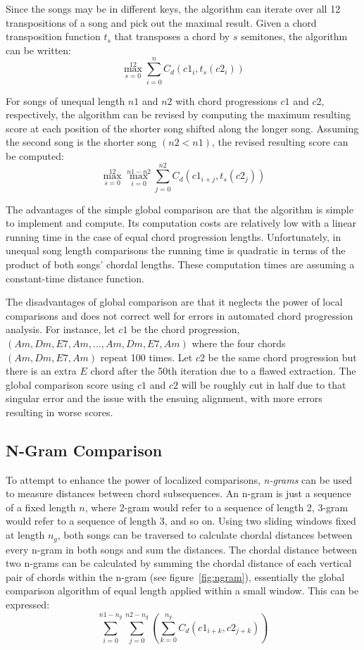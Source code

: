 Since the songs may be in different keys, the algorithm can iterate over all 12 transpositions of a song and pick out the maximal result. Given a chord transposition function $t_s$ that transposes a chord by $s$ semitones, the algorithm can be written: \[ \max_{s=0}^{12} \sum_{i=0}^n C_d({c1}_i, t_s({c2}_i)) \]

For songs of unequal length ${n1}$ and ${n2}$ with chord progressions ${c1}$ and ${c2}$, respectively, the algorithm can be revised by computing the maximum resulting score at each position of the shorter song shifted along the longer song. Assuming the second song is the shorter song $({n2} < {n1})$, the revised resulting score can be computed: \[ \max_{s=0}^{12} \max_{i=0}^{{n1} - {n2}} \sum_{j=0}^{n2} C_d({c1}_{i+j}, t_s({c2}_j)) \]

The advantages of the simple global comparison are that the algorithm is simple to implement and compute. Its computation costs are relatively low with a linear running time in the case of equal chord progression lengths. Unfortunately, in unequal song length comparisons the running time is quadratic in terms of the product of both songs' chordal lengths. These computation times are assuming a constant-time distance function.

The disadvantages of global comparison are that it neglects the power of local comparisons and does not correct well for errors in automated chord progression analysis. For instance, let ${c1}$ be the chord progression, $(Am, Dm, E7, Am, ... , Am, Dm, E7, Am)$ where the four chords $(Am, Dm, E7, Am)$ repeat 100 times. Let ${c2}$ be the same chord progression but there is an extra $E$ chord after the 50th iteration due to a flawed extraction. The global comparison score using ${c1}$ and ${c2}$ will be roughly cut in half due to that singular error and the issue with the ensuing alignment, with more errors resulting in worse scores.

\subsection{N-Gram Comparison}

To attempt to enhance the power of localized comparisons, \textit{n-grams} can be used to measure distances between chord subsequences. An n-gram is just a sequence of a fixed length $n$, where 2-gram would refer to a sequence of length 2, 3-gram would refer to a sequence of length 3, and so on. Using two sliding windows fixed at length $n_g$, both songs can be traversed to calculate chordal distances between every n-gram in both songs and sum the distances. The chordal distance between two n-grams can be calculated by summing the chordal distance of each vertical pair of chords within the n-gram (see figure~\ref{fig:ngram}), essentially the global comparison algorithm of equal length applied within a small window. This can be expressed: \[\sum_{i=0}^{n1 - n_g} \sum_{j=0}^{n2 - n_g} \left( \sum_{k=0}^{n_g} C_d({c1}_{i+k}, {c2}_{j+k}) \right) \]